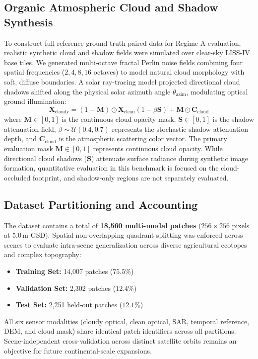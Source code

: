 \subsection{Organic Atmospheric Cloud and Shadow Synthesis}
To construct full-reference ground truth paired data for Regime A evaluation, realistic synthetic cloud and shadow fields were simulated over clear-sky LISS-IV base tiles. We generated multi-octave fractal Perlin noise fields combining four spatial frequencies ($2, 4, 8, 16$ octaves) to model natural cloud morphology with soft, diffuse boundaries. A solar ray-tracing model projected directional cloud shadows shifted along the physical solar azimuth angle $\theta_{\text{azim}}$, modulating optical ground illumination:
\begin{equation}
    \mathbf{X}_{\text{cloudy}} = (1 - \mathbf{M}) \odot \mathbf{X}_{\text{clean}} (1 - \beta \mathbf{S}) + \mathbf{M} \odot \mathbf{C}_{\text{cloud}}
\end{equation}
where $\mathbf{M} \in [0, 1]$ is the continuous cloud opacity mask, $\mathbf{S} \in [0, 1]$ is the shadow attenuation field, $\beta \sim \mathcal{U}(0.4, 0.7)$ represents the stochastic shadow attenuation depth, and $\mathbf{C}_{\text{cloud}}$ is the atmospheric scattering color vector. The primary evaluation mask $\mathbf{M} \in [0, 1]$ represents continuous cloud opacity. While directional cloud shadows ($\mathbf{S}$) attenuate surface radiance during synthetic image formation, quantitative evaluation in this benchmark is focused on the cloud-occluded footprint, and shadow-only regions are not separately evaluated.


\subsection{Dataset Partitioning and Accounting}
The dataset contains a total of \textbf{18,560 multi-modal patches} ($256\times 256$ pixels at $5.0\,\text{m}$ GSD). Spatial non-overlapping quadrant splitting was enforced across scenes to evaluate intra-scene generalization across diverse agricultural ecotopes and complex topography:
\begin{itemize}
    \item \textbf{Training Set:} 14,007 patches ($75.5\%$)
    \item \textbf{Validation Set:} 2,302 patches ($12.4\%$)
    \item \textbf{Test Set:} 2,251 held-out patches ($12.1\%$)
\end{itemize}
All six sensor modalities (cloudy optical, clean optical, SAR, temporal reference, DEM, and cloud mask) share identical patch identifiers across all partitions. Scene-independent cross-validation across distinct satellite orbits remains an objective for future continental-scale expansions.
